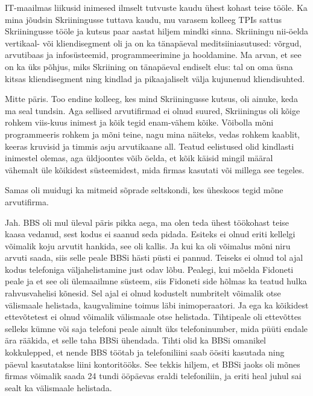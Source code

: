IT-maailmas liikusid inimesed ilmselt tutvuste kaudu ühest kohast 
teise tööle. Ka mina jõudsin Skriiningusse tuttava 
kaudu, mu varasem kolleeg TPIs sattus 
Skriiningusse tööle ja kutsus paar aastat hiljem mindki sinna. 
Skriiningu nii-öelda vertikaal- või kliendisegment oli ja on ka tänapäeval 
meditsiiniasutused: võrgud, arvutibaas ja infosüsteemid, 
programmeerimine ja hooldamine. Ma arvan, et see on ka üks põhjus, miks 
Skriining on tänapäeval endiselt elus: tal on oma 
üsna kitsas kliendisegment ning kindlad ja pikaajaliselt välja kujunenud kliendisuhted.


Mitte päris. Too endine kolleeg, kes mind Skriiningusse
kutsus, oli ainuke, keda ma seal tundsin. Aga sellised arvutifirmad ei olnud suured, Skriiningus oli kõige rohkem viis-kuus 
inimest ja kõik tegid enam-vähem kõike. Võibolla 
mõni programmeeris rohkem ja mõni teine, nagu mina näiteks, vedas rohkem 
kaablit, keeras kruvisid ja timmis asju 
arvutikaane all. Teatud eelistused olid kindlasti inimestel olemas, aga 
üldjoontes võib öelda, et kõik käisid mingil määral vähemalt üle kõikidest süsteemidest, mida firmas kasutati või millega see tegeles.

Samas oli muidugi ka mitmeid sõprade seltskondi, kes üheskoos tegid mõne arvutifirma.


Jah. BBS oli mul üleval päris pikka aega, ma olen teda ühest töökohast teise kaasa vedanud, sest kodus ei saanud seda pidada. 
Esiteks ei olnud eriti kellelgi võimalik koju arvutit hankida, see oli kallis. 
Ja kui ka oli võimalus mõni niru arvuti saada, siis selle peale 
BBSi hästi püsti ei pannud. Teiseks ei olnud tol ajal kodus telefoniga 
väljahelistamine just odav lõbu. Pealegi, kui mõelda 
Fidoneti peale ja et see oli ülemaailmne süsteem, siis Fidoneti side 
hõlmas ka teatud hulka rahvusvahelisi kõnesid. Sel ajal ei olnud kodustelt numbritelt 
võimalik otse välismaale helistada, kaugvalimine toimus läbi 
inimoperaatori. Ja ega ka kõikidest ettevõtetest ei olnud võimalik välismaale 
otse helistada. Tihtipeale oli ettevõttes selleks kümne 
või saja telefoni peale ainult üks telefoninumber, mida püüti 
endale ära rääkida, et selle taha BBSi ühendada. Tihti olid ka 
BBSi omanikel kokkulepped, et nende BBS töötab ja telefoniliini saab öösiti kasutada 
ning päeval kasutatakse liini kontoritööks. 
See tekkis hiljem, et BBSi jaoks oli mõnes firmas võimalik 
saada 24 tundi ööpäevas eraldi telefoniliin, ja eriti heal juhul sai sealt ka 
välismaale helistada.

